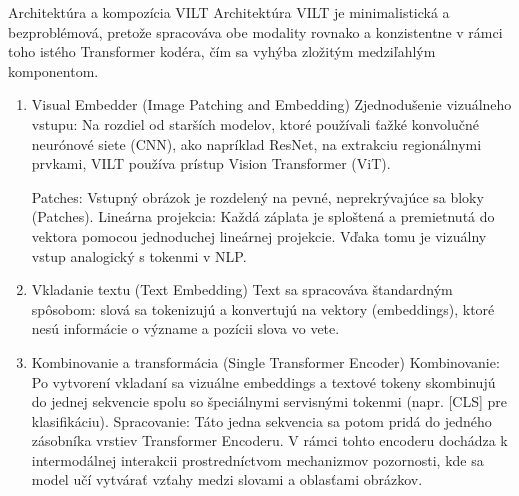 \documentclass[]{tukediphc}
\begin{document}
Architektúra a kompozícia VILT Architektúra VILT je minimalistická a bezproblémová, pretože spracováva obe modality rovnako a konzistentne v rámci toho istého Transformer kodéra, čím sa vyhýba zložitým medziľahlým komponentom. 







\begin{enumerate}
    \item Visual Embedder (Image Patching and Embedding) Zjednodušenie vizuálneho vstupu: Na rozdiel od starších modelov, ktoré používali ťažké konvolučné neurónové siete (CNN), ako napríklad ResNet, na extrakciu regionálnymi prvkami, VILT používa prístup Vision Transformer (ViT). \cite{arxiv:2102.03334}
    
    Patches: Vstupný obrázok je rozdelený na pevné, neprekrývajúce sa bloky (Patches). Lineárna projekcia: Každá záplata je sploštená a premietnutá do vektora pomocou jednoduchej lineárnej projekcie. Vďaka tomu je vizuálny vstup analogický s tokenmi v NLP.
    \item Vkladanie textu (Text Embedding) Text sa spracováva štandardným spôsobom: slová sa tokenizujú a konvertujú na vektory (embeddings), ktoré nesú informácie o význame a pozícii slova vo vete. 
    \item Kombinovanie a transformácia (Single Transformer Encoder) Kombinovanie: Po vytvorení vkladaní sa vizuálne embeddings a textové tokeny skombinujú do jednej sekvencie spolu so špeciálnymi servisnými tokenmi (napr. [CLS] pre klasifikáciu). \cite{arxiv:2102.03334} Spracovanie: Táto jedna sekvencia sa potom pridá do jedného zásobníka vrstiev Transformer Encoderu. V rámci tohto encoderu dochádza k intermodálnej interakcii prostredníctvom mechanizmov pozornosti, kde sa model učí vytvárať vzťahy medzi slovami a oblasťami obrázkov.
\end{enumerate}
\end{document}
